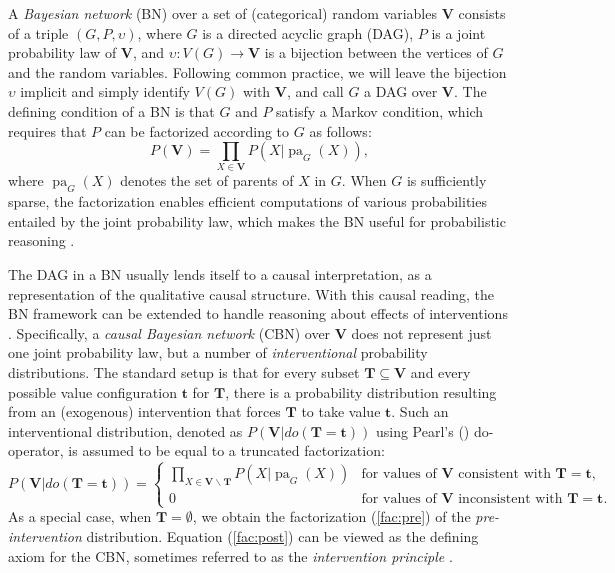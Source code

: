 \documentclass[12pt]{amsart}
\theoremstyle{plain}
\theoremstyle{definition}
\theoremstyle{remark}
\numberwithin{equation}{section}
\theoremstyle{plain}
\newcommand{\0}{\emptyset}
\DeclareMathOperator{\pa}{pa}
\newcommand{\memph}[1]{{\color{magenta}\emph{#1}}}
\begin{document}
 A \memph{Bayesian network} (BN) over a set of (categorical) random variables $\mathbf{V}$ consists of a triple $(G, P, \upsilon)$, where $G$ is a directed acyclic graph (DAG), $P$ is a joint probability law of $\mathbf{V}$, and $\upsilon: V(G)\rightarrow \mathbf{V}$ is a bijection between the vertices of $G$ and the random variables. Following common practice, we will leave the bijection $\upsilon$ implicit and simply identify $V(G)$ with $\mathbf{V}$, and call $G$ a DAG over $\mathbf{V}$. The defining condition of a BN is that $G$ and $P$ satisfy a Markov condition, which requires that $P$ can be factorized according to $G$ as follows: \begin{equation}
 \label{fac:pre}
 P(\mathbf{V}) = \prod_{X\in \mathbf{V}}P(X | \pa_{G}(X)),
\end{equation} where $\pa_G(X)$ denotes the set of parents of $X$ in $G$. When $G$ is sufficiently sparse, the factorization enables efficient computations of various probabilities entailed by the joint probability law, which makes the BN useful for probabilistic reasoning \cite{Pearl1988}.

 The DAG in a BN usually lends itself to a causal interpretation, as a representation of the qualitative causal structure. With this causal reading, the BN framework can be extended to handle reasoning about effects of interventions \cite{SGS2000, pearl2009causality}. Specifically, a \memph{causal Bayesian network} (CBN) over $\mathbf{V}$ does not represent just one joint probability law, but a number of \memph{interventional} probability distributions. The standard setup is that for every subset $\mathbf{T}\subseteq \mathbf{V}$ and every possible value configuration $\mathbf{t}$ for $\mathbf{T}$, there is a probability distribution resulting from an (exogenous) intervention that forces $\mathbf{T}$ to take value $\mathbf{t}$. Such an interventional distribution, denoted as $P(\mathbf{V} | do(\mathbf{T}=\mathbf{t}))$ using Pearl's (\cite{pearl2009causality}) do-operator, is assumed to be equal to a truncated factorization:
\begin{equation}
\label{fac:post}
P(\mathbf{V} | do(\mathbf{T}=\mathbf{t})) = \left\{
\begin{array}{ll}
\prod_{X\in \mathbf{V}\backslash \mathbf{T}}P(X | \pa_G(X)) & \textrm{for values of } \mathbf{V} \textrm{ consistent with } \mathbf{T} = \mathbf{t}, \\
0 & \textrm{for values of } \mathbf{V} \textrm{ inconsistent with } \mathbf{T} = \mathbf{t}.
\end{array}\right.
\end{equation}
As a special case, when $\mathbf{T}=\emptyset$, we obtain the factorization (\ref{fac:pre}) of the \memph{pre-intervention} distribution. Equation (\ref{fac:post}) can be viewed as the defining axiom for the CBN, sometimes referred to as the \memph{intervention principle} \cite{zhang2011intervention}.
\end{document}
